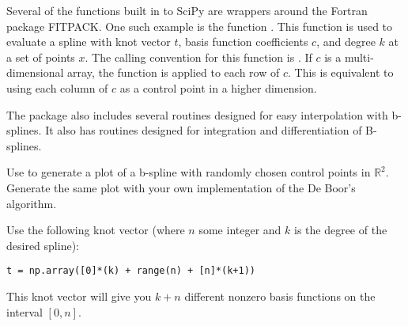 Several of the functions built in to SciPy are wrappers around the Fortran package FITPACK.
One such example is the function .
This function is used to evaluate a spline with knot vector $t$, basis function coefficients $c$, and degree $k$ at a set of points $x$.
The calling convention for this function is .
If $c$ is a multi-dimensional array, the function is applied to each row of $c$.
This is equivalent to using each column of $c$ as a control point in a higher dimension.

The package  also includes several routines designed for easy interpolation with b-splines.
It also has routines designed for integration and differentiation of B-splines.

\begin{problem}
Use  to generate a plot of a b-spline with randomly chosen control points in $\mathbb{R}^2$.
Generate the same plot with your own implementation of the De Boor's algorithm.

Use the following knot vector (where $n$ some integer and $k$ is the degree of the desired spline):
\begin{lstlisting}
t = np.array([0]*(k) + range(n) + [n]*(k+1))
\end{lstlisting}
This knot vector will give you $k + n$ different nonzero basis functions on the interval $\left[0, n\right]$.
\end{problem}
